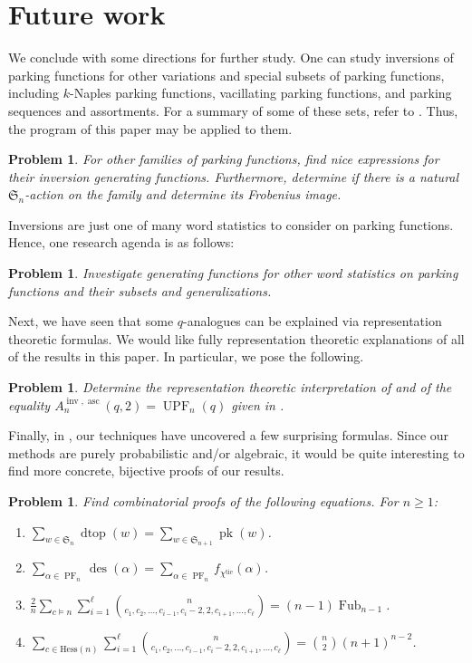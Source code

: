 \documentclass{amsart}
\renewcommand{\S}{\mathfrak{S}}
\DeclareMathOperator{\des}{des}
\DeclareMathOperator{\asc}{asc}
\DeclareMathOperator{\inv}{inv}
\DeclareMathOperator{\dtop}{dtop}
\DeclareMathOperator{\tie}{tie}
\DeclareMathOperator{\PF}{PF}
\DeclareMathOperator{\UPF}{UPF} %
\DeclareMathOperator{\Fub}{Fub}
\newtheorem{problem}[theorem]{Problem}
\theoremstyle{definition}
\begin{document}
\section{Future work}\label{sec:future-work}
We  conclude with some directions for further study.
One can study inversions of parking functions for other variations and special subsets of parking functions, including
$k$-Naples parking functions, vacillating parking functions, 
and parking sequences and assortments. For a summary of some of these sets, refer to \cite{bib:Carlson+}. 
Thus, the program of this paper may be applied to them.
\begin{problem}
    For other families of parking functions, find nice expressions for their inversion generating functions. Furthermore, determine if there is a natural $\S_n$-action on the family and determine its Frobenius image.
\end{problem} 
Inversions are just one of many word statistics to consider on parking functions. Hence, one research agenda is as follows:
\begin{problem}
    Investigate generating functions for other word statistics on parking functions and their subsets and generalizations. 
\end{problem} 
Next, we have seen that some $q$-analogues can be explained via representation theoretic formulas. We would like fully representation theoretic explanations of all of the results in this paper. In particular, we pose the following.
\begin{problem}
    Determine the representation theoretic interpretation of  and of the equality $A_n^{\inv,\asc}(q,2)=\UPF_n(q)$ given in .
\end{problem}
Finally, in , our techniques have uncovered a few surprising formulas. Since our methods are purely probabilistic and/or algebraic, it would be quite interesting to find more concrete, bijective proofs of our results.
\begin{problem}\label{problem: combinatorial-proofs}
    Find combinatorial proofs of the following equations. For $n\geq 1$:
    \begin{enumerate}
        \item $ \displaystyle\sum_{w\in \S_n}\dtop(w)=\displaystyle\sum_{w\in \S_{n+1}}\operatorname{pk}(w)$.
        \item $\displaystyle\sum_{\alpha\in \PF_n}\des(\alpha)=\displaystyle\sum_{\alpha\in \PF_n}f_{\chi^{\tie}}(\alpha)$.
        \item $\frac{2}{n}\displaystyle\sum_{c\vDash n}\displaystyle\sum_{i=1}^\ell \binom{n}{c_1,c_2,\dots,c_{i-1},c_i-2,2,c_{i+1},\dots,c_\ell}=(n-1)\Fub_{n-1}$.
        \item $\displaystyle\sum_{c\in \mathrm{Hess}(n)}\displaystyle\sum_{i=1}^\ell \binom{n}{c_1,c_2,\dots,c_{i-1},c_i-2,2,c_{i+1},\dots,c_\ell}=\binom{n}{2}(n+1)^{n-2}$.
    \end{enumerate}
    \end{problem}
\end{document}

